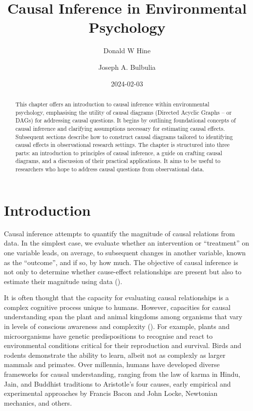\documentclass[
  singlecolumn]{article}
\title{Causal Inference in Environmental Psychology}
\author{Donald W Hine \and Joseph A. Bulbulia}
\date{2024-02-03}
\begin{document}
\maketitle
\begin{abstract}
This chapter offers an introduction to causal inference within
environmental psychology, emphasising the utility of causal diagrams
(Directed Acyclic Graphs -- or DAGs) for addressing causal questions. It
begins by outlining foundational concepts of causal inference and
clarifying assumptions necessary for estimating causal effects.
Subsequent sections describe how to construct causal diagrams tailored
to identifying causal effects in observational research settings. The
chapter is structured into three parts: an introduction to principles of
causal inference, a guide on crafting causal diagrams, and a discussion
of their practical applications. It aims to be useful to researchers who
hope to address causal questions from observational data.
\end{abstract}

\section{Introduction}\label{introduction}

Causal inference attempts to quantify the magnitude of causal relations
from data. In the simplest case, we evaluate whether an intervention or
``treatment'' on one variable leads, on average, to subsequent changes
in another variable, known as the ``outcome'', and if so, by how much.
The objective of causal inference is not only to determine whether
cause-effect relationships are present but also to estimate their
magnitude using data ().

It is often thought that the capacity for evaluating causal
relationships is a complex cognitive process unique to humans. However,
capacities for causal understanding span the plant and animal kingdoms
among organisms that vary in levels of conscious awareness and
complexity (). For
example, plants and microorganisms have genetic predispositions to
recognise and react to environmental conditions critical for their
reproduction and survival. Birds and rodents demonstrate the ability to
learn, albeit not as complexly as larger mammals and primates. Over
millennia, humans have developed diverse frameworks for causal
understanding, ranging from the law of karma in Hindu, Jain, and
Buddhist traditions to Aristotle's four causes, early empirical and
experimental approaches by Francis Bacon and John Locke, Newtonian
mechanics, and others.
\end{document}
